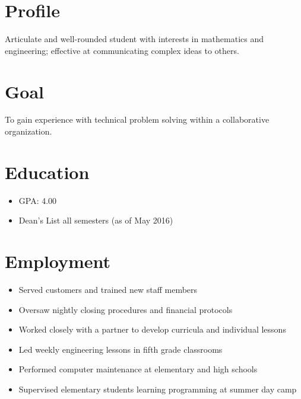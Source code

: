 \documentclass{resume}
\begin{document}


    \noindent {}

    \section{Profile}
    Articulate and well-rounded student with interests in mathematics and engineering; effective at communicating complex ideas to others.

    \section{Goal}
    To gain experience with technical problem solving within a collaborative organization.

    \section{Education}
        \begin{itemize}[noitemsep]
            \item GPA: 4.00
            \item Dean's List all semesters (as of May 2016)
        \end{itemize}

    \section{Employment}
        \begin{itemize}[noitemsep]
            \item Served customers and trained new staff members
            \item Oversaw nightly closing procedures and financial protocols
        \end{itemize}
        \begin{itemize}[noitemsep]
            \item Worked closely with a partner to develop curricula and individual lessons
            \item Led weekly engineering lessons in fifth grade classrooms
        \end{itemize}
        \begin{itemize}[noitemsep]
            \item Performed computer maintenance at elementary and high schools
            \item Supervised elementary students learning programming at summer day camp
        \end{itemize}
\end{document}
